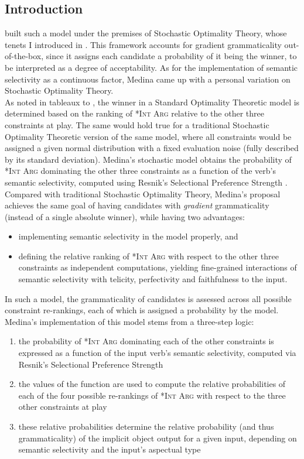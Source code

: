 \subsection{Introduction} \textcite{Medina2007} built such a model under the premises of Stochastic Optimality Theory, whose tenets I introduced in . This framework accounts for gradient grammaticality out-of-the-box, since it assigns each candidate a probability of it being the winner, to be interpreted as a degree of acceptability. As for the implementation of semantic selectivity as a continuous factor, Medina came up with a personal variation on Stochastic Optimality Theory.\\
As noted in tableaux  to , the winner in a Standard Optimality Theoretic model is determined based on the ranking of \textsc{*Int Arg} relative to the other three constraints at play. The same would hold true for a traditional Stochastic Optimality Theoretic version of the same model, where all constraints would be assigned a given normal distribution with a fixed evaluation noise (fully described by its standard deviation). Medina's stochastic model obtains the probability of \textsc{*Int Arg} dominating the other three constraints as a function of the verb's semantic selectivity, computed using Resnik's Selectional Preference Strength \parencite{Resnik1993,Resnik1996}. Compared with traditional Stochastic Optimality Theory, Medina's proposal achieves the same goal of having candidates with \textit{gradient} grammaticality (instead of a single absolute winner), while having two advantages:
\begin{itemize}
    \item implementing semantic selectivity in the model properly, and
    \item defining the relative ranking of \textsc{*Int Arg} with respect to the other three constraints as independent computations, yielding fine-grained interactions of semantic selectivity with telicity, perfectivity and faithfulness to the input.
\end{itemize}
In such a model, the grammaticality of candidates is assessed across all possible constraint re-rankings, each of which is assigned a probability by the model. Medina's implementation of this model stems from a three-step logic: 
\begin{enumerate}
    \item the probability of \textsc{*Int Arg} dominating each of the other constraints is expressed as a function of the input verb's semantic selectivity, computed via Resnik's Selectional Preference Strength
    \item the values of the function are used to compute the relative probabilities of each of the four possible re-rankings of \textsc{*Int Arg} with respect to the three other constraints at play
    \item these relative probabilities determine the relative probability (and thus grammaticality) of the implicit object output for a given input, depending on semantic selectivity and the input's aspectual type
\end{enumerate}

